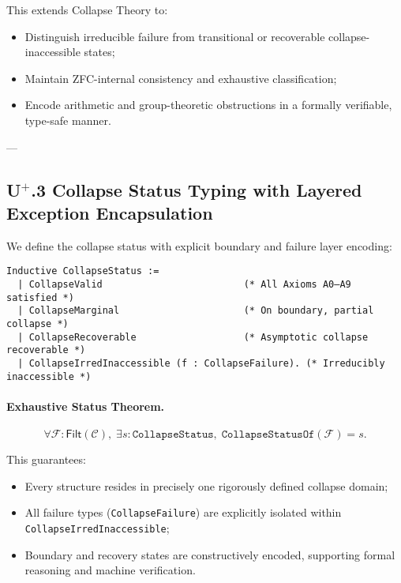 \documentclass[11pt]{article}
\begin{document}
This extends Collapse Theory to:

\begin{itemize}
    \item Distinguish irreducible failure from transitional or recoverable collapse-inaccessible states;
    \item Maintain ZFC-internal consistency and exhaustive classification;
    \item Encode arithmetic and group-theoretic obstructions in a formally verifiable, type-safe manner.
\end{itemize}

---

\subsection*{U$^{+}$.3 Collapse Status Typing with Layered Exception Encapsulation}

We define the collapse status with explicit boundary and failure layer encoding:

\begin{lstlisting}[language=Coq]
Inductive CollapseStatus :=
  | CollapseValid                         (* All Axioms A0–A9 satisfied *)
  | CollapseMarginal                      (* On boundary, partial collapse *)
  | CollapseRecoverable                   (* Asymptotic collapse recoverable *)
  | CollapseIrredInaccessible (f : CollapseFailure). (* Irreducibly inaccessible *)
\end{lstlisting}

\paragraph{Exhaustive Status Theorem.}

\[
\forall \mathcal{F} : \mathsf{Filt}(\mathcal{C}),\;
\exists s : \texttt{CollapseStatus},\; \texttt{CollapseStatusOf}(\mathcal{F}) = s.
\]

This guarantees:

\begin{itemize}
    \item Every structure resides in precisely one rigorously defined collapse domain;
    \item All failure types (\texttt{CollapseFailure}) are explicitly isolated within \texttt{CollapseIrredInaccessible};
    \item Boundary and recovery states are constructively encoded, supporting formal reasoning and machine verification.
\end{itemize}
\end{document}
